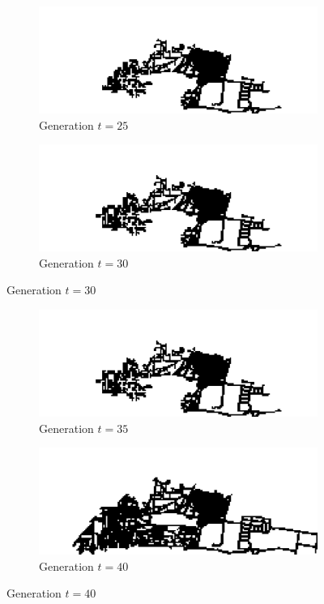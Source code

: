 \begin{figure}[H]
\begin{subfigure}{.5\textwidth}
  \centering
  \includegraphics[width=1\linewidth]{Figures/Chapter4/generation-25-melusi}
  \caption*{Generation $t = 25$}
\end{subfigure}
\begin{subfigure}{.5\textwidth}
  \centering
  \includegraphics[width=1\linewidth]{Figures/Chapter4/generation-30-melusi}
  \caption*{Generation $t = 30$}
\end{subfigure}
\end{figure}

\begin{figure}[H]
\begin{subfigure}{.5\textwidth}
  \centering
  \includegraphics[width=1\linewidth]{Figures/Chapter4/generation-35-melusi}
  \caption*{Generation $t = 35$}
\end{subfigure}
\begin{subfigure}{.5\textwidth}
  \centering
  \includegraphics[width=1\linewidth]{Figures/Chapter4/generation-40-melusi}
  \caption*{Generation $t = 40$}
\end{subfigure}
\end{figure}

